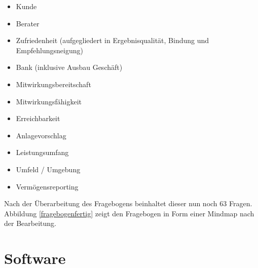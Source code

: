 \documentclass{article}\usepackage[]{graphicx}\usepackage[]{color}
\begin{document}
\begin{itemize}
\item Kunde
\item Berater
\item Zufriedenheit (aufgegliedert in Ergebnisqualität, Bindung und Empfehlungsneigung)
\item Bank (inklusive Ausbau Geschäft)
\item Mitwirkungsbereitschaft
\item Mitwirkungsfähigkeit
\item Erreichbarkeit
\item Anlagevorschlag
\item Leistungsumfang
\item Umfeld / Umgebung
\item Vermögensreporting
\end{itemize}

Nach der Überarbeitung des Fragebogens beinhaltet dieser nun noch 63 Fragen. Abbildung \ref{fragebogenfertig} zeigt den Fragebogen in Form einer Mindmap nach der Bearbeitung.




\label{fragebogenfertig}







\section{Software}%
\end{document}
